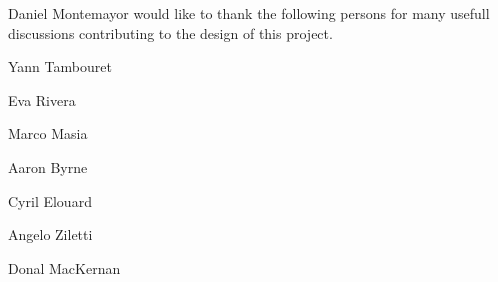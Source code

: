 Daniel Montemayor would like to thank the following persons for many usefull discussions contributing to the design of this project.


\begin{DoxyItemize}
\item Yann Tambouret
\item Eva Rivera
\item Marco Masia
\item Aaron Byrne
\item Cyril Elouard
\item Angelo Ziletti
\item Donal Mac\+Kernan 
\end{DoxyItemize}